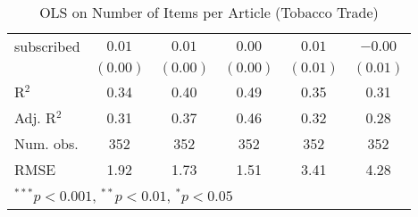 \begin{table}[!h]
\begin{center}
\begin{tabular}{l c c c c c }
subscribed              & $0.01$       & $0.01$       & $0.00$       & $0.01$       & $-0.00$      \\
                        & $(0.00)$     & $(0.00)$     & $(0.00)$     & $(0.01)$     & $(0.01)$     \\
\midrule
R$^2$                   & 0.34         & 0.40         & 0.49         & 0.35         & 0.31         \\
Adj. R$^2$              & 0.31         & 0.37         & 0.46         & 0.32         & 0.28         \\
Num. obs.               & 352          & 352          & 352          & 352          & 352          \\
RMSE                    & 1.92         & 1.73         & 1.51         & 3.41         & 4.28         \\
\bottomrule
\multicolumn{6}{l}{\scriptsize{$^{***}p<0.001$, $^{**}p<0.01$, $^*p<0.05$}}
\end{tabular}
\caption{OLS on Number of Items per Article (Tobacco Trade)}
\label{table:coefficients}
\end{center}
\end{table}
